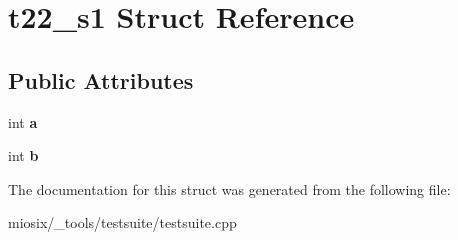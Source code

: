 \hypertarget{structt22__s1}{\section{t22\-\_\-s1 Struct Reference}
\label{structt22__s1}
}
\subsection*{Public Attributes}
\begin{DoxyCompactItemize}
\item 
\hypertarget{structt22__s1_a47e20220532be7e5992e5516d769e9c6}{int {\bfseries a}}\label{structt22__s1_a47e20220532be7e5992e5516d769e9c6}

\item 
\hypertarget{structt22__s1_a87ea218ab852b9d0d2200f31aab00e9c}{int {\bfseries b}}\label{structt22__s1_a87ea218ab852b9d0d2200f31aab00e9c}

\end{DoxyCompactItemize}


The documentation for this struct was generated from the following file\-:\begin{DoxyCompactItemize}
\item 
miosix/\-\_\-tools/testsuite/testsuite.\-cpp\end{DoxyCompactItemize}
